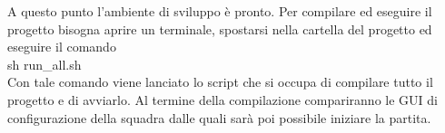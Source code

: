 \noindent A questo punto l'ambiente di sviluppo \`{e} pronto. Per compilare ed eseguire il progetto bisogna aprire un terminale, spostarsi nella cartella del progetto ed eseguire il comando\\
sh run_all.sh\\
Con tale comando viene lanciato lo script che si occupa di compilare tutto il progetto e di avviarlo. Al termine della compilazione compariranno le GUI di configurazione della squadra dalle quali sar\`{a} poi possibile iniziare la partita.